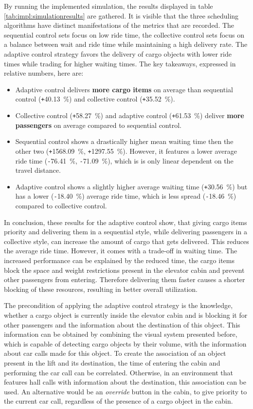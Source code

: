 By running the implemented simulation, the results displayed in table \ref{tab:impl:simulationresults} are gathered.
It is visible that the three scheduling algorithms have distinct manifestations of the metrics that are recorded.
The sequential control sets focus on low ride time, the collective control sets focus on a balance between wait and ride time while maintaining a high delivery rate. 
The adaptive control strategy favors the delivery of cargo objects with lower ride times while trading for higher waiting times.
The key takeaways, expressed in relative numbers, here are:

\begin{itemize}
    \item Adaptive control delivers \textbf{more cargo items} on average than sequential control (\texttt{+}40.13~\%) and collective control (\texttt{+}35.52~\%).
    \item Collective control (\texttt{+}58.27~\%) and adaptive control (\texttt{+}61.53~\%) deliver \textbf{more passengers} on average compared to sequential control. 
    \item Sequential control shows a drastically higher mean waiting time then the other two (\texttt{+}1568.09~\%, \texttt{+}1297.55~\%). However, it features a lower average ride time (\texttt{-}76.41~\%, \texttt{-}71.09~\%), which is is only linear dependent on the travel distance.
    \item Adaptive control shows a slightly higher average waiting time (\texttt{+}30.56~\%) but has a lower (\texttt{-}18.40~\%) average ride time, which is less spread (\texttt{-}18.46~\%) compared to collective control.
\end{itemize}

In conclusion, these results for the adaptive control show, that giving cargo items priority and delivering them in a sequential style, while delivering passengers in a collective style, 
can increase the amount of cargo that gets delivered. 
This reduces the average ride time. 
However, it comes with a trade-off in waiting time.
The increased performance can be explained by the reduced time, 
the cargo items block the space and weight restrictions present in the elevator cabin and prevent other passengers from entering.
Therefore delivering them faster causes a shorter blocking of these resources, resulting in better overall utilization.

The precondition of applying the adaptive control strategy is the knowledge, 
whether a cargo object is currently inside the elevator cabin and is blocking it for other passengers 
and the information about the destination of this object.
This information can be obtained by combining the visual system presented before, which is capable of detecting cargo objects by their volume, with the information about car calls made for this object. To create the association of an object present in the lift and its destination, 
the time of entering the cabin and performing the car call can be correlated.
Otherwise, in an environment that features hall calls with information about the destination, this association can be used.
An alternative would be an \emph{override} button in the cabin, 
to give priority to the current car call, regardless of the presence of a cargo object in the cabin.

